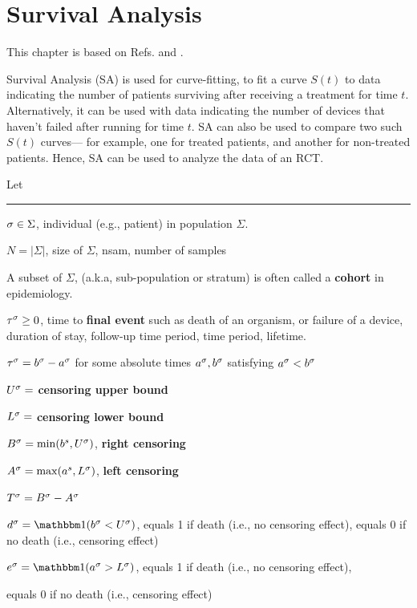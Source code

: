 \chapter{Survival Analysis}
\label{ch-survival}

This chapter is based
on Refs.\cite{lily-xu-284} and \cite{wiki-survival-anal}.

Survival Analysis (SA) is used for curve-fitting, to
fit a curve $S(t)$ to data indicating the number of patients surviving
after receiving a treatment for time $t$.
Alternatively, it can be used with data indicating  the number of
devices that haven't failed after running for time $t$.
SA can also be used  to compare two such $S(t)$ curves---
for example, one for treated patients, and another for non-treated
patients. Hence, SA can be used to analyze the data of an RCT.

Let
\hrule

$\sigma\in \Sigma$, individual (e.g., patient) in population $\Sigma$.

$N=|\Sigma|$,  size of $\Sigma$, nsam, number of samples

A subset of $\Sigma$, (a.k.a, sub-population
or stratum)
is often called a {\bf cohort}
in epidemiology.

$\tau^\sigma\geq 0$, time to
{\bf final event} such as death of an organism, or failure
of a device, duration of stay,
follow-up time period,
time period,
lifetime.

$\tau^\sigma = b^\sigma -a^\sigma$ for some absolute times
$a^\sigma, b^\sigma$ satisfying
$a^\sigma<b^\sigma$

$U^\sigma=$ {\bf censoring upper bound}

$L^\sigma=$ {\bf censoring lower bound}

$B^\sigma = \min(b^s, U^\sigma)$, {\bf right censoring}

$A^\sigma = \max(a^s, L^\sigma)$, {\bf left censoring}

$T^\sigma = B^\sigma - A^\sigma$

$d^\s = \indi(b^\s < U^\s)$, equals 1
if death (i.e., no censoring effect),
equals 0 if no death (i.e., censoring effect)

$e^\s = \indi(a^\s > L^\s)$, equals 1
if death (i.e., no censoring effect),

equals 0 if no death (i.e., censoring   effect)


